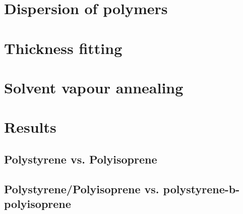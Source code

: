 \documentclass[MasterThesisMain.tex]{subfiles}
\begin{document}
\section{Dispersion of polymers}



\section{Thickness fitting}

\section{Solvent vapour annealing}

\section{Results}

\subsection{Polystyrene vs. Polyisoprene}

\subsection{Polystyrene/Polyisoprene vs. polystyrene-b-polyisoprene}
\end{document}
